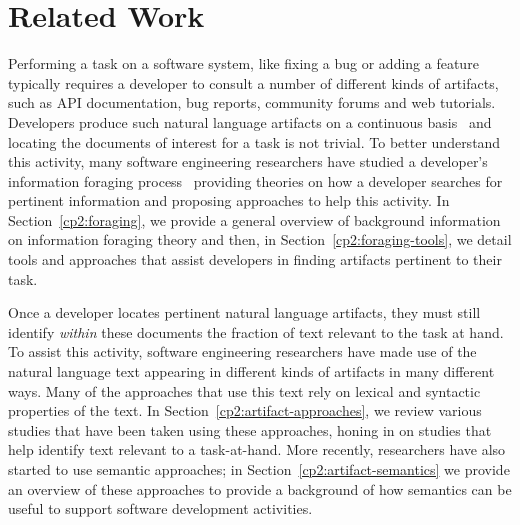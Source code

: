 \setcounter{chapter}{1}


\chapter{Related Work}
\label{ch:related-work}








Performing a task on a software system, like fixing a bug
or adding a feature typically requires a developer to consult
a number of different kinds of artifacts, such
as API documentation, bug reports, community forums
and web tutorials. 
Developers produce such natural language artifacts on a 
continuous basis~\cite{Rastkar2013t} 
and locating the documents of interest for a task
is not trivial. 
To better understand this activity, 
many software engineering researchers 
have studied  a developer's information foraging process~\cite{Pirolli1999}
providing theories on how a developer searches for pertinent information
and proposing approaches to help this activity.
In Section~\ref{cp2:foraging},
we provide a general overview of background information on 
information foraging theory and 
then, in Section~\ref{cp2:foraging-tools}, we detail tools and approaches that assist developers in finding artifacts pertinent to their task.



Once a developer locates pertinent
natural language artifacts, 
they must still identify \textit{within} these documents 
the fraction of text relevant to the task at hand.
To assist this activity, software engineering researchers have made use of the natural language text appearing in different kinds of artifacts in many different ways.
Many of the approaches that
use this text rely on lexical and syntactic properties of the text. 
In Section~\ref{cp2:artifact-approaches}, we review various studies that have been taken using these approaches,
honing in on studies that help identify text relevant to a task-at-hand.
More recently, researchers have also started to use semantic approaches; 
in Section~\ref{cp2:artifact-semantics} we 
provide an overview of these approaches to provide a background of
how semantics can be useful to support software development activities.



\clearpage





% 
% 